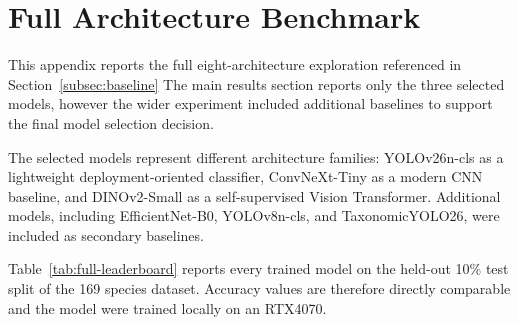 \documentclass[journal,transmag]{IEEEtran}
\begin{document}





 


%

\clearpage
\appendices

\section{\textbf{Full Architecture Benchmark}}\label{app:full-bench}


This appendix reports the full eight-architecture exploration referenced in Section~\ref{subsec:baseline} The main results section reports only the three selected models, however the wider experiment included additional baselines to support the final model selection decision. 

The selected models represent different architecture families: YOLOv26n-cls as a lightweight deployment-oriented classifier, ConvNeXt-Tiny as a modern CNN baseline, and DINOv2-Small as a self-supervised Vision Transformer. Additional models, including EfficientNet-B0, YOLOv8n-cls, and TaxonomicYOLO26, were included as secondary baselines.
 
Table~\ref{tab:full-leaderboard} reports every trained model on the held-out 10\% test split of the 169 species dataset. Accuracy values are therefore directly comparable and the model were trained locally on an RTX4070.
\end{document}
